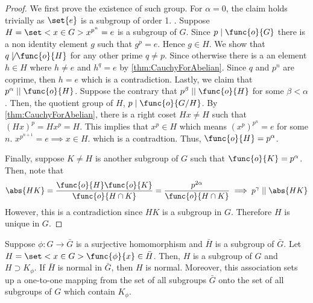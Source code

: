 \begin{proof}
    We first prove the existence of such group. For \(\alpha = 0\), the claim holds trivially as \(\set{e}\) is a subgroup of order 1. . Suppose \(H = \set<x \in G>{x^{p^n} = e}\) is a subgroup of \(G\). Since \(p \mid \func{o}{G}\) there is a non identity element \(g\) such that \(g^p = e\). Hence \(g \in H\). We show that \(q \not \mid \func{o}{H}\) for any other prime \(q \neq p\). Since otherwise there is a an element \(h \in H\) where \(h \neq e \) and \(h^q = e\) by \ref{thm:CauchyForAbelian}. Since \(q\) and \(p^n\) are coprime, then \(h = e\) which is a contradiction. Lastly, we claim that \(p^{\alpha} \mid\mid \func{o}{H}\). Suppose the contrary that \(p^{\beta} \mid\mid \func{o}{H}\) for some \(\beta < \alpha\). Then, the quotient group of \(H\), \(p \mid \func{o}{G/H}\). By \ref{thm:CauchyForAbelian}, there is a right coset \(Hx \neq H\) such that \((Hx)^p = Hx^p = H\). This implies that \(x^p \in H\) which means \((x^p)^{p^n} = e\) for some \(n\). \(x^{p^{n+1}} = e \implies x \in H\). which is a contradtion. Thus, \(\func{o}{H} = p^{\alpha}\).

    Finally, suppose \(K \neq H\) is another subgroup of \(G\) such that \(\func{o}{K} = p^{\alpha}\). Then, note that 
    \begin{equation*}
        \abs{HK} = \dfrac{\func{o}{H} \func{o}{K}}{\func{o}{H \cap K}} = \dfrac{p^{2\alpha}}{\func{o}{H \cap K}} \implies p^{\gamma} \mid\mid \abs{HK}
    \end{equation*}
    However, this is a contradiction since  \(HK\) is a subgroup in \(G\). Therefore \(H\) is unique in \(G\).
\end{proof}

\begin{lemma}
    Suppose \(\phi: G \to \bar{G}\) is a surjective homomorphism and \(\bar{H}\) is a subgroup of \(\bar{G}\). Let \(H = \set<x \in G>{\func{\phi}{x} \in \bar{H}}\). Then, \(H\) is a subgroup of \(G\) and \(H \supset K_{\phi}\). If \(\bar{H}\) is normal in \(\bar{G}\), then \(H\) is normal. Moreover, this association sets up a one-to-one mapping from the set of all subgroups \(\bar{G}\) onto the set of all subgroups of \(G\) which contain \(K_{\phi}\).
\end{lemma}

